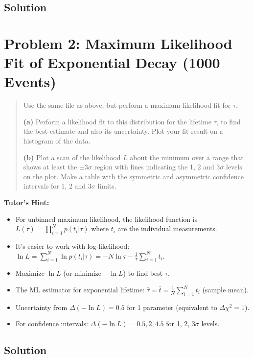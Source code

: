 \documentclass[11pt]{article}
\begin{document}
\subsection{Solution}


\section{Problem 2: Maximum Likelihood Fit of Exponential Decay (1000 Events)}

\begin{quote}
    Use the same file as above, but perform a maximum likelihood fit for $\tau$.

    \textbf{(a)} Perform a likelihood fit to this distribution for the lifetime $\tau$, to find the best estimate and also its uncertainty. Plot your fit result on a histogram of the data.

    \textbf{(b)} Plot a scan of the likelihood $L$ about the minimum over a range that shows at least the $\pm 3\sigma$ region with lines indicating the 1, 2 and 3$\sigma$ levels on the plot. Make a table with the symmetric and asymmetric confidence intervals for 1, 2 and 3$\sigma$ limits.
\end{quote}

\textbf{Tutor's Hint:}
\begin{itemize}
    \item For unbinned maximum likelihood, the likelihood function is $L(\tau) = \prod_{i=1}^{N} p(t_i|\tau)$ where $t_i$ are the individual measurements.
    \item It's easier to work with log-likelihood: $\ln L = \sum_{i=1}^{N} \ln p(t_i|\tau) = -N\ln\tau - \frac{1}{\tau}\sum_{i=1}^{N} t_i$.
    \item Maximize $\ln L$ (or minimize $-\ln L$) to find best $\tau$.
    \item The ML estimator for exponential lifetime: $\hat{\tau} = \bar{t} = \frac{1}{N}\sum_{i=1}^{N} t_i$ (sample mean).
    \item Uncertainty from $\Delta(-\ln L) = 0.5$ for 1 parameter (equivalent to $\Delta\chi^2 = 1$).
    \item For confidence intervals: $\Delta(-\ln L) = 0.5, 2, 4.5$ for 1, 2, 3$\sigma$ levels.
\end{itemize}

\subsection{Solution}
\end{document}
